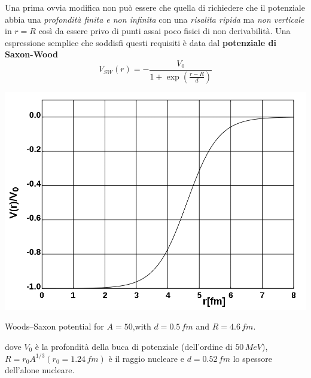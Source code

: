 Una prima ovvia modifica non può essere che quella di richiedere che il potenziale abbia una \emph{profondità finita e non infinita}
con una \emph{risalita ripida} ma \emph{non verticale} in $r=R$ così da essere privo di punti assai poco fisici di non derivabilità.
Una espressione semplice che soddisfi questi requisiti è data dal \textbf{potenziale di Saxon-Wood}
\[
V_{SW}(r) = -\frac{V_{0}}{1 + \exp{\left( \frac{r-R}{d} \right)}}
\]
\begin{marginfigure}
	\includegraphics{figs/saxon-woods-potential}
	\caption{Woods–Saxon potential for $A = 50$,with $d = 0.5 \, fm$ and $R=4.6 \, fm$.}
	\label{fig:saxon-woods-graph}
\end{marginfigure}
dove $V_{0}$ è la profondità della buca di potenziale (dell’ordine di $50 \, MeV$), $R=r_{0}A^{1/3} (r_{0} = 1.24 \, fm)$ è il raggio nucleare e $d = 0.52 \, fm$ lo spessore dell’alone nucleare.

